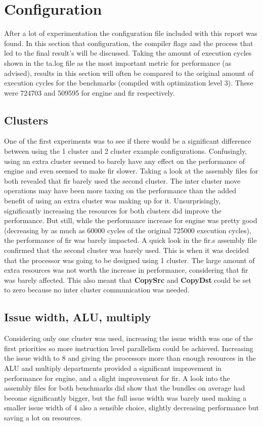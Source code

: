 \section{Configuration}
After a lot of experimentation the configuration file included with this report was found. In this section that configuration, the compiler flags and the process that led to the final result's will be discussed. Taking the amount of execution cycles shown in the ta.log file as the most important metric for performance (as advised), results in this section will often be compared to the original amount of execution cycles for the benchmarks (compiled with optimization level 3). These were 724703 and 509595 for engine and fir respectively.

\subsection{Clusters}
One of the first experiments was to see if there would be a significant difference between using the 1 cluster and 2 cluster example configurations. Confusingly, using an extra cluster seemed to barely have any effect on the performance of engine and even seemed to make fir slower. Taking a look at the assembly files for both revealed that fir barely used the second cluster. The inter cluster move operations may have been more taxing on the performance than the added benefit of using an extra cluster was making up for it. Unsurprisingly, significantly increasing the resources for both clusters did improve the performance. But still, while the performance increase for engine was pretty good (decreasing by as much as 60000 cycles of the original 725000 execution cycles), the performance of fir was barely impacted. A quick look in the fir.s assembly file confirmed that the second cluster was barely used. This is when it was decided that the processor was going to be designed using 1 cluster. The large amount of extra resources was not worth the increase in performance, considering that fir was barely affected. This also meant that \textbf{CopySrc} and \textbf{CopyDst} could be set to zero because no inter cluster communication was needed.

\subsection{Issue width, ALU, multiply}
Considering only one cluster was used, increasing the issue width was one of the first priorities so more instruction level parallelism could be achieved. Increasing the issue width to 8 and giving the processors more than enough resources in the ALU and multiply departments provided a significant improvement in performance for engine, and a slight improvement for fir. A look into the assembly files for both benchmarks did show that the bundles on average had become significantly bigger, but the full issue width was barely used making a smaller issue width of 4 also a sensible choice, slightly decreasing performance but saving a lot on resources.


